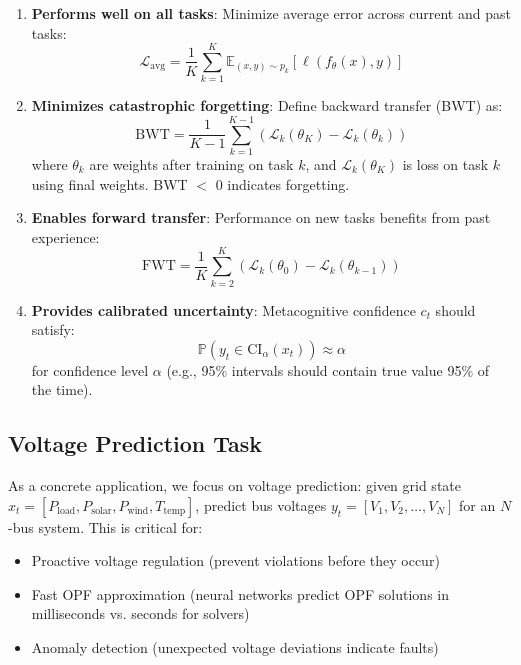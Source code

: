 \documentclass[journal]{IEEEtran}
\begin{document}
\begin{enumerate}
    \item \textbf{Performs well on all tasks}: Minimize average error across current and past tasks:
    \begin{equation}
    \mathcal{L}_{\text{avg}} = \frac{1}{K} \sum_{k=1}^K \mathbb{E}_{(x,y) \sim p_k} [\ell(f_\theta(x), y)]
    \end{equation}
    
    \item \textbf{Minimizes catastrophic forgetting}: Define backward transfer (BWT) as:
    \begin{equation}
    \text{BWT} = \frac{1}{K-1} \sum_{k=1}^{K-1} \left( \mathcal{L}_k(\theta_K) - \mathcal{L}_k(\theta_k) \right)
    \end{equation}
    where $\theta_k$ are weights after training on task $k$, and $\mathcal{L}_k(\theta_K)$ is loss on task $k$ using final weights. BWT $<$ 0 indicates forgetting.
    
    \item \textbf{Enables forward transfer}: Performance on new tasks benefits from past experience:
    \begin{equation}
    \text{FWT} = \frac{1}{K} \sum_{k=2}^K \left( \mathcal{L}_k(\theta_0) - \mathcal{L}_k(\theta_{k-1}) \right)
    \end{equation}
    
    \item \textbf{Provides calibrated uncertainty}: Metacognitive confidence $c_t$ should satisfy:
    \begin{equation}
    \mathbb{P}(y_t \in \text{CI}_\alpha(x_t)) \approx \alpha
    \end{equation}
    for confidence level $\alpha$ (e.g., 95\% intervals should contain true value 95\% of the time).
\end{enumerate}

\subsection{Voltage Prediction Task}

As a concrete application, we focus on voltage prediction: given grid state $x_t = [P_{\text{load}}, P_{\text{solar}}, P_{\text{wind}}, T_{\text{temp}}]$, predict bus voltages $y_t = [V_1, V_2, \ldots, V_N]$ for an $N$-bus system. This is critical for:
\begin{itemize}
    \item Proactive voltage regulation (prevent violations before they occur)
    \item Fast OPF approximation (neural networks predict OPF solutions in milliseconds vs. seconds for solvers)
    \item Anomaly detection (unexpected voltage deviations indicate faults)
\end{itemize}
\end{document}
